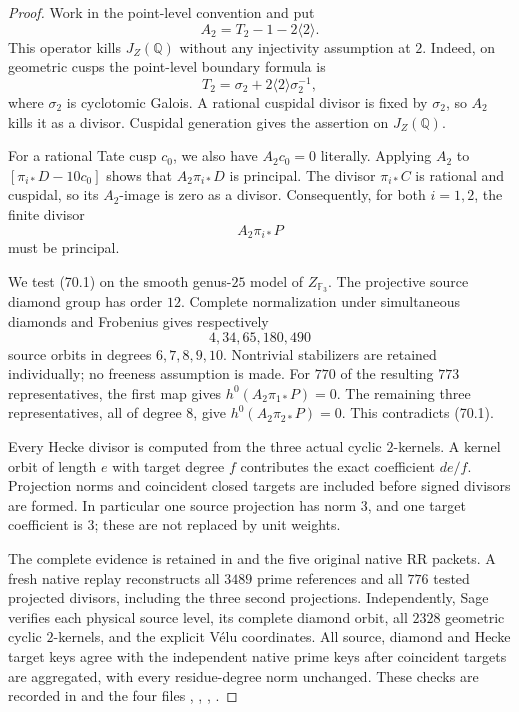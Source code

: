 \begin{proof}
Work in the point-level convention and put
\[
                         A_2=T_2-1-2\langle2\rangle.
\]
This operator kills $J_Z(\mathbb Q)$ without any injectivity
assumption at $2$. Indeed, on geometric cusps the point-level
boundary formula is
\[
             T_2=\sigma_2+2\langle2\rangle\sigma_2^{-1},
\]
where $\sigma_2$ is cyclotomic Galois. A rational cuspidal divisor
is fixed by $\sigma_2$, so $A_2$ kills it as a divisor. Cuspidal
generation gives the assertion on $J_Z(\mathbb Q)$.

For a rational Tate cusp $c_0$, we also have $A_2c_0=0$ literally.
Applying $A_2$ to $[\pi_{i*}D-10c_0]$ shows that
$A_2\pi_{i*}D$ is principal. The divisor $\pi_{i*}C$ is rational
and cuspidal, so its $A_2$-image is zero as a divisor. Consequently,
for both $i=1,2$, the finite divisor
\[
                         A_2\pi_{i*}P                  \tag{70.1}
\]
must be principal.

We test (70.1) on the smooth genus-$25$ model of
$Z_{\mathbb F_3}$. The projective source diamond group has order
$12$. Complete normalization under simultaneous diamonds and
Frobenius gives respectively
\[
                         4,34,65,180,490
\]
source orbits in degrees $6,7,8,9,10$. Nontrivial stabilizers are
retained individually; no freeness assumption is made. For $770$
of the resulting $773$ representatives, the first map gives
$h^0(A_2\pi_{1*}P)=0$. The remaining three representatives, all of
degree $8$, give $h^0(A_2\pi_{2*}P)=0$. This contradicts (70.1).

Every Hecke divisor is computed from the three actual cyclic
$2$-kernels. A kernel orbit of length $e$ with target degree $f$
contributes the exact coefficient $de/f$. Projection norms and
coincident closed targets are included before signed divisors are
formed. In particular one source projection has norm $3$, and one
target coefficient is $3$; these are not replaced by unit weights.

The complete evidence is retained in  and the five
original native RR packets. A fresh native replay reconstructs all
$3489$ prime references and all $776$ tested projected divisors,
including the three second projections. Independently, Sage verifies
each physical source level, its complete diamond orbit, all $2328$
geometric cyclic $2$-kernels, and the explicit V\'{e}lu coordinates.
All source, diamond and Hecke target keys agree with the independent
native prime keys after coincident targets are aggregated, with
every residue-degree norm unchanged. These checks are recorded in
 and the four files
, ,
, .
\end{proof}
